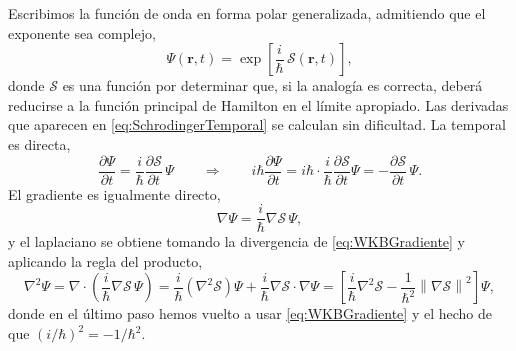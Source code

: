         Escribimos la función de onda en forma polar generalizada, admitiendo que el exponente sea complejo,
        \begin{equation}\label{eq:FormaWKB}
            \Psi(\mathbf{r},t) = \exp\left[\frac{i}{\hbar}\,\mathcal{S}(\mathbf{r},t)\right],
        \end{equation}
        donde $\mathcal{S}$ es una función por determinar que, si la analogía es correcta, deberá reducirse a la función principal de Hamilton en el límite apropiado. Las derivadas que aparecen en \eqref{eq:SchrodingerTemporal} se calculan sin dificultad. La temporal es directa,
        \begin{equation}\label{eq:WKBTemporal}
            \frac{\partial\Psi}{\partial t} = \frac{i}{\hbar}\frac{\partial\mathcal{S}}{\partial t}\,\Psi
            \qquad\Longrightarrow\qquad
            i\hbar\frac{\partial\Psi}{\partial t} = i\hbar\cdot\frac{i}{\hbar}\frac{\partial\mathcal{S}}{\partial t}\Psi = -\frac{\partial\mathcal{S}}{\partial t}\,\Psi .
        \end{equation}
        El gradiente es igualmente directo,
        \begin{equation}\label{eq:WKBGradiente}
            \nabla\Psi = \frac{i}{\hbar}\nabla\mathcal{S}\,\Psi,
        \end{equation}
        y el laplaciano se obtiene tomando la divergencia de \eqref{eq:WKBGradiente} y aplicando la regla del producto,
        \begin{equation}\label{eq:WKBLaplaciano}
            \nabla^{2}\Psi = \nabla\cdot\left(\frac{i}{\hbar}\nabla\mathcal{S}\,\Psi\right)
            = \frac{i}{\hbar}\left(\nabla^{2}\mathcal{S}\right)\Psi + \frac{i}{\hbar}\nabla\mathcal{S}\cdot\nabla\Psi
            = \left[\frac{i}{\hbar}\nabla^{2}\mathcal{S} - \frac{1}{\hbar^{2}}\left\|\nabla\mathcal{S}\right\|^{2}\right]\Psi,
        \end{equation}
        donde en el último paso hemos vuelto a usar \eqref{eq:WKBGradiente} y el hecho de que $\left(i/\hbar\right)^{2} = -1/\hbar^{2}$.

